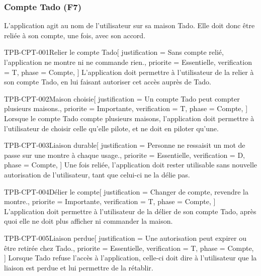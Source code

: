 \subsubsection{Compte Tado (F7)}

L'application agit au nom de l'utilisateur sur sa maison Tado. Elle doit donc être reliée à
son compte, une fois, avec son accord.

\begin{exigence}{TPB-CPT-001}{Relier le compte Tado}[
    justification = {Sans compte relié, l'application ne montre ni ne commande rien.},
    priorite      = {Essentielle},
    verification  = {T},
    phase         = {Compte},
  ]
  L'application doit permettre à l'utilisateur de la relier à son compte Tado, en lui
  faisant autoriser cet accès auprès de Tado.
\end{exigence}

\begin{exigence}{TPB-CPT-002}{Maison choisie}[
    justification = {Un compte Tado peut compter plusieurs maisons.},
    priorite      = {Importante},
    verification  = {T},
    phase         = {Compte},
  ]
  Lorsque le compte Tado compte plusieurs maisons, l'application doit permettre à
  l'utilisateur de choisir celle qu'elle pilote, et ne doit en piloter qu'une.
\end{exigence}

\begin{exigence}{TPB-CPT-003}{Liaison durable}[
    justification = {Personne ne ressaisit un mot de passe sur une montre à chaque usage.},
    priorite      = {Essentielle},
    verification  = {D},
    phase         = {Compte},
  ]
  Une fois reliée, l'application doit rester utilisable sans nouvelle autorisation de
  l'utilisateur, tant que celui-ci ne la délie pas.
\end{exigence}

\begin{exigence}{TPB-CPT-004}{Délier le compte}[
    justification = {Changer de compte, revendre la montre.},
    priorite      = {Importante},
    verification  = {T},
    phase         = {Compte},
  ]
  L'application doit permettre à l'utilisateur de la délier de son compte Tado, après
  quoi elle ne doit plus afficher ni commander la maison.
\end{exigence}

\begin{exigence}{TPB-CPT-005}{Liaison perdue}[
    justification = {Une autorisation peut expirer ou être retirée chez Tado.},
    priorite      = {Essentielle},
    verification  = {T},
    phase         = {Compte},
  ]
  Lorsque Tado refuse l'accès à l'application, celle-ci doit dire à l'utilisateur que la
  liaison est perdue et lui permettre de la rétablir.
\end{exigence}


